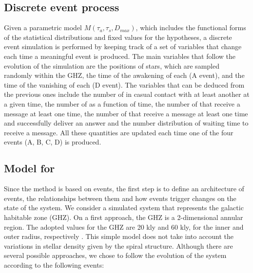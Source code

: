 



\subsection{Discrete event process}

Given a parametric model $M(\tau_a, \tau_s, D_{max})$, which includes
the functional forms of the statistical distributions and fixed values
for the hypotheses, a discrete event simulation is performed by
keeping track of a set of variables that change each time a meaningful
event is produced.
%
The main variables that follow the evolution of the simulation are the
positions of stars, which are sampled randomly within the GHZ, the
time of the awakening of each \ceti{} (A event), and the time of the
vanishing of each \ceti{} (D event).
%
The variables that can be deduced from the previous ones include the
number of \cetis{} in casual contact with at least another \ceti{} at a given
time, the number of \cetis{} as a function of time, the number of
\cetis{}
that receive a message at least one time, the number of \cetis{} that
receive a message at least one time and successfully deliver an answer
and the number distribution of waiting time to receive a message.
%
All these quantities are updated each time one of the four events (A,
B, C, D) is produced.
          


           

\subsection{Model for \cetis{}}

Since the method is based on events, the first step is to define an
architecture of events, the relationships between them and how events
trigger changes on the state of the system.
%
We consider a simulated system that represents the galactic habitable
zone (GHZ).
%
On a first approach, the GHZ is a 2-dimensional annular region.
%
The adopted values for the GHZ are 20 kly and 60 kly, for the inner
and outer radius, respectively \citep{lineweaver_galactic_2004}.
%
This simple model does not take into account the variations in stellar
density given by the spiral structure.
%
Although there are several possible approaches, we chose to follow the
evolution of the system according to the following events:

